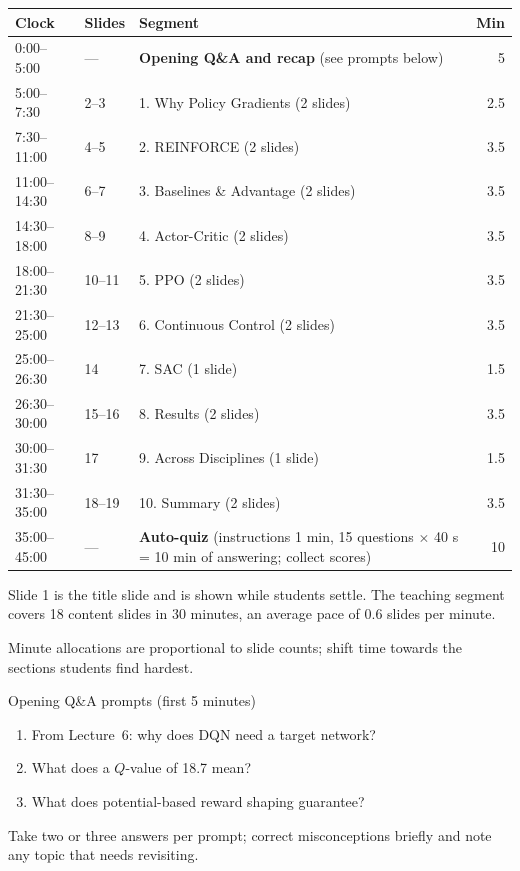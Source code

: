 \documentclass[11pt]{article}
\begin{document}
\begin{center}\small\renewcommand{\arraystretch}{1.2}\begin{tabularx}{\textwidth}{@{}l l X r@{}}\toprule\textbf{Clock} & \textbf{Slides} & \textbf{Segment} & \textbf{Min}\\\midrule

0:00--5:00 & --- & \textbf{Opening Q\&A and recap} (see prompts below) & 5\\

5:00--7:30 & 2--3 & 1. Why Policy Gradients (2 slides) & 2.5\\

7:30--11:00 & 4--5 & 2. REINFORCE (2 slides) & 3.5\\

11:00--14:30 & 6--7 & 3. Baselines \& Advantage (2 slides) & 3.5\\

14:30--18:00 & 8--9 & 4. Actor-Critic (2 slides) & 3.5\\

18:00--21:30 & 10--11 & 5. PPO (2 slides) & 3.5\\

21:30--25:00 & 12--13 & 6. Continuous Control (2 slides) & 3.5\\

25:00--26:30 & 14 & 7. SAC (1 slide) & 1.5\\

26:30--30:00 & 15--16 & 8. Results (2 slides) & 3.5\\

30:00--31:30 & 17 & 9. Across Disciplines (1 slide) & 1.5\\

31:30--35:00 & 18--19 & 10. Summary (2 slides) & 3.5\\

35:00--45:00 & --- & \textbf{Auto-quiz} (instructions 1 min, 15 questions $\times$ 40 s = 10 min of answering; collect scores) & 10\\\bottomrule\end{tabularx}\end{center}

Slide 1 is the title slide and is shown while students settle. The teaching segment covers 18 content slides in 30 minutes, an average pace of 0.6 slides per minute. 

Minute allocations are proportional to slide counts; shift time towards the sections students find hardest.

\begin{instr}{Opening Q\&A prompts (first 5 minutes)}\begin{enumerate}\item From Lecture~6: why does DQN need a target network?\item What does a $Q$-value of 18.7 mean?\item What does potential-based reward shaping guarantee?\end{enumerate}Take two or three answers per prompt; correct misconceptions briefly and note any topic that needs revisiting.\end{instr}
\end{document}

